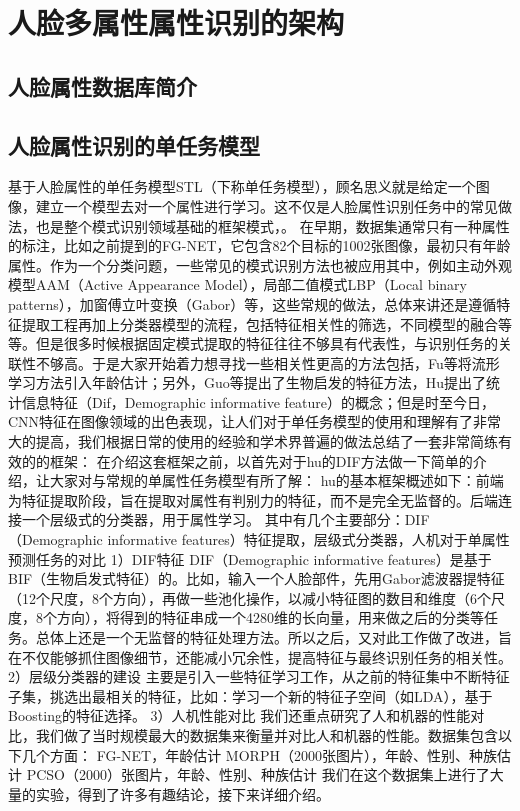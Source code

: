 \chapter{人脸多属性属性识别的架构}
\section{人脸属性数据库简介}
\section{人脸属性识别的单任务模型}
基于人脸属性的单任务模型STL（下称单任务模型），顾名思义就是给定一个图像，建立一个模型去对一个属性进行学习。这不仅是人脸属性识别任务中的常见做法，也是整个模式识别领域基础的框架模式，。
在早期，数据集通常只有一种属性的标注，比如之前提到的FG-NET，它包含82个目标的1002张图像，最初只有年龄属性。作为一个分类问题，一些常见的模式识别方法也被应用其中，例如主动外观模型AAM（Active  Appearance  Model），局部二值模式LBP（Local binary patterns），加窗傅立叶变换（Gabor）等，这些常规的做法，总体来讲还是遵循特征提取工程再加上分类器模型的流程，包括特征相关性的筛选，不同模型的融合等等。但是很多时候根据固定模式提取的特征往往不够具有代表性，与识别任务的关联性不够高。于是大家开始着力想寻找一些相关性更高的方法包括，Fu等将流形学习方法引入年龄估计；另外，Guo等提出了生物启发的特征方法，Hu提出了统计信息特征（Dif，Demographic informative feature）的概念；但是时至今日，CNN特征在图像领域的出色表现，让人们对于单任务模型的使用和理解有了非常大的提高，我们根据日常的使用的经验和学术界普遍的做法总结了一套非常简练有效的的框架：
在介绍这套框架之前，以首先对于hu的DIF方法做一下简单的介绍，让大家对与常规的单属性任务模型有所了解：
hu的基本框架概述如下：前端为特征提取阶段，旨在提取对属性有判别力的特征，而不是完全无监督的。后端连接一个层级式的分类器，用于属性学习。
其中有几个主要部分：DIF（Demographic informative features）特征提取，层级式分类器，人机对于单属性预测任务的对比
1）DIF特征
DIF（Demographic informative features）是基于BIF（生物启发式特征）的。比如，输入一个人脸部件，先用Gabor滤波器提特征（12个尺度，8个方向），再做一些池化操作，以减小特征图的数目和维度（6个尺度，8个方向），将得到的特征串成一个4280维的长向量，用来做之后的分类等任务。总体上还是一个无监督的特征处理方法。所以之后，又对此工作做了改进，旨在不仅能够抓住图像细节，还能减小冗余性，提高特征与最终识别任务的相关性。
2）层级分类器的建设
主要是引入一些特征学习工作，从之前的特征集中不断特征子集，挑选出最相关的特征，比如：学习一个新的特征子空间（如LDA），基于Boosting的特征选择。
3）人机性能对比
我们还重点研究了人和机器的性能对比，我们做了当时规模最大的数据集来衡量并对比人和机器的性能。数据集包含以下几个方面：
FG-NET，年龄估计
MORPH（2000张图片），年龄、性别、种族估计
PCSO（2000）张图片，年龄、性别、种族估计
我们在这个数据集上进行了大量的实验，得到了许多有趣结论，接下来详细介绍。


